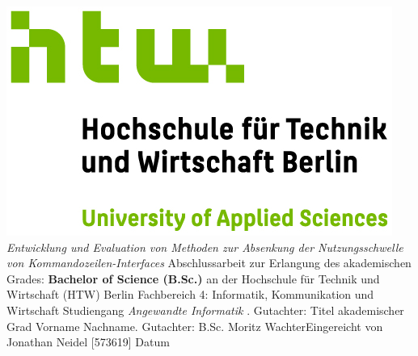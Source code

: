 \documentclass[oneside,bibliography=totocnumbered,BCOR=5mm]{scrbook}
\begin{document}
\begin{titlepage}
\begin{center}
\includegraphics{htw-logo.jpg}
\linebreak[4]
\linebreak[4]
\linebreak[4]
\linebreak[4]
\textit{\large Entwicklung und Evaluation von Methoden zur Absenkung der Nutzungsschwelle von Kommandozeilen-Interfaces}
\linebreak[4]
\linebreak[4]
\linebreak[4]
Abschlussarbeit
\linebreak[4]
\linebreak[4]
zur Erlangung des akademischen Grades:
\linebreak[4]
\linebreak[4]
\textbf{Bachelor of Science (B.Sc.)}
\linebreak[4]
\linebreak[4]
an der
\linebreak[4]
\linebreak[4]
Hochschule f\"ur Technik und Wirtschaft (HTW) Berlin
\linebreak[4]
Fachbereich 4: Informatik, Kommunikation und Wirtschaft
\linebreak[4]
Studiengang \textit{Angewandte Informatik}
\linebreak[4]
\linebreak[4]
. Gutachter: Titel akademischer Grad Vorname Nachname. Gutachter: B.Sc. Moritz Wachter\linebreak[4]
\linebreak[4]
\linebreak[4]
\linebreak[4]
\linebreak[4]
Eingereicht von Jonathan Neidel [573619]
\linebreak[4]
\linebreak[4]
\linebreak[4]
\linebreak[4]
Datum

\end{center}
\end{titlepage}
\newpage
\end{document}

